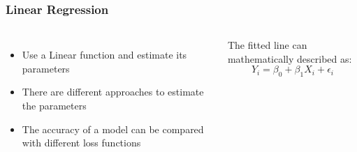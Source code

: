 \documentclass{beamer}
\begin{document}

\begin{frame}
\frametitle{Linear Regression}
\begin{columns}[c] %

\begin{itemize}
\item Use a Linear function and estimate its parameters
\item There are different approaches to estimate the parameters
\item The accuracy of a model can be compared with different loss functions
\end{itemize}

The fitted line can mathematically described as:
\begin{equation}
Y_i = \beta_0 + \beta_1 X_i + \epsilon_i
\end{equation}

\end{columns}
\end{frame}

\end{document}

